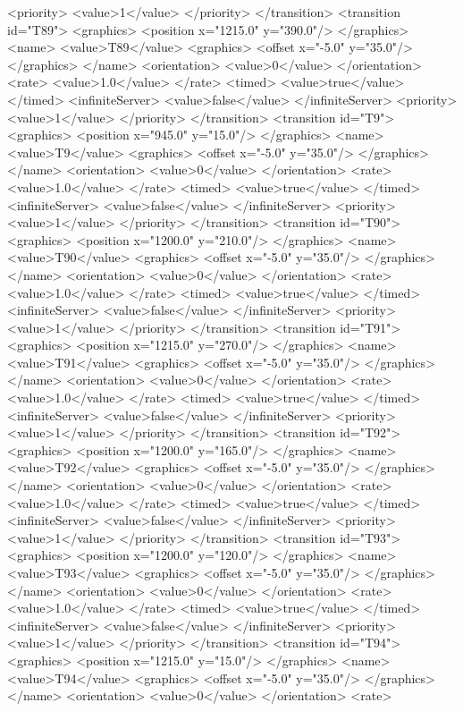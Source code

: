 <priority>
<value>1</value>
</priority>
</transition>
<transition id="T89">
<graphics>
<position x="1215.0" y="390.0"/>
</graphics>
<name>
<value>T89</value>
<graphics>
<offset x="-5.0" y="35.0"/>
</graphics>
</name>
<orientation>
<value>0</value>
</orientation>
<rate>
<value>1.0</value>
</rate>
<timed>
<value>true</value>
</timed>
<infiniteServer>
<value>false</value>
</infiniteServer>
<priority>
<value>1</value>
</priority>
</transition>
<transition id="T9">
<graphics>
<position x="945.0" y="15.0"/>
</graphics>
<name>
<value>T9</value>
<graphics>
<offset x="-5.0" y="35.0"/>
</graphics>
</name>
<orientation>
<value>0</value>
</orientation>
<rate>
<value>1.0</value>
</rate>
<timed>
<value>true</value>
</timed>
<infiniteServer>
<value>false</value>
</infiniteServer>
<priority>
<value>1</value>
</priority>
</transition>
<transition id="T90">
<graphics>
<position x="1200.0" y="210.0"/>
</graphics>
<name>
<value>T90</value>
<graphics>
<offset x="-5.0" y="35.0"/>
</graphics>
</name>
<orientation>
<value>0</value>
</orientation>
<rate>
<value>1.0</value>
</rate>
<timed>
<value>true</value>
</timed>
<infiniteServer>
<value>false</value>
</infiniteServer>
<priority>
<value>1</value>
</priority>
</transition>
<transition id="T91">
<graphics>
<position x="1215.0" y="270.0"/>
</graphics>
<name>
<value>T91</value>
<graphics>
<offset x="-5.0" y="35.0"/>
</graphics>
</name>
<orientation>
<value>0</value>
</orientation>
<rate>
<value>1.0</value>
</rate>
<timed>
<value>true</value>
</timed>
<infiniteServer>
<value>false</value>
</infiniteServer>
<priority>
<value>1</value>
</priority>
</transition>
<transition id="T92">
<graphics>
<position x="1200.0" y="165.0"/>
</graphics>
<name>
<value>T92</value>
<graphics>
<offset x="-5.0" y="35.0"/>
</graphics>
</name>
<orientation>
<value>0</value>
</orientation>
<rate>
<value>1.0</value>
</rate>
<timed>
<value>true</value>
</timed>
<infiniteServer>
<value>false</value>
</infiniteServer>
<priority>
<value>1</value>
</priority>
</transition>
<transition id="T93">
<graphics>
<position x="1200.0" y="120.0"/>
</graphics>
<name>
<value>T93</value>
<graphics>
<offset x="-5.0" y="35.0"/>
</graphics>
</name>
<orientation>
<value>0</value>
</orientation>
<rate>
<value>1.0</value>
</rate>
<timed>
<value>true</value>
</timed>
<infiniteServer>
<value>false</value>
</infiniteServer>
<priority>
<value>1</value>
</priority>
</transition>
<transition id="T94">
<graphics>
<position x="1215.0" y="15.0"/>
</graphics>
<name>
<value>T94</value>
<graphics>
<offset x="-5.0" y="35.0"/>
</graphics>
</name>
<orientation>
<value>0</value>
</orientation>
<rate>
